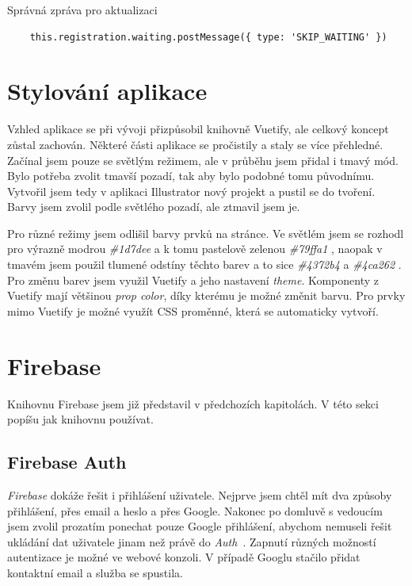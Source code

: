 \begin{listing}[h]
    \caption{Správná zpráva pro aktualizaci}
    \begin{verbatim}
    this.registration.waiting.postMessage({ type: 'SKIP_WAITING' })
    \end{verbatim}
\end{listing}

\section{Stylování aplikace}
Vzhled aplikace se při vývoji přizpůsobil knihovně Vuetify, ale celkový koncept zůstal zachován. Některé části aplikace
se pročistily a staly se více přehledné. Začínal jsem pouze se světlým režimem, ale v průběhu jsem přidal i tmavý mód.
Bylo potřeba zvolit tmavší pozadí, tak aby bylo podobné tomu původnímu. Vytvořil jsem tedy v aplikaci Illustrator nový projekt
a pustil se do tvoření. Barvy jsem zvolil podle světlého pozadí, ale ztmavil jsem je.

Pro různé režimy jsem odlišil barvy prvků na stránce. Ve světlém jsem se rozhodl pro výrazně modrou \emph{\#1d7dee}  a k tomu
pastelově zelenou \emph{\#79ffa1}  , naopak v tmavém jsem použil tlumené odstíny těchto barev a to sice \emph{\#4372b4}   a \emph{\#4ca262}  .
Pro změnu barev jsem využil Vuetify a jeho nastavení \emph{theme}. Komponenty z Vuetify mají většinou \emph{prop color}, díky
kterému je možné změnit barvu. Pro prvky mimo Vuetify je možné využít CSS proměnné, která se automaticky vytvoří.

\section{Firebase}

Knihovnu Firebase jsem již představil v předchozích kapitolách. V této sekci popíšu jak knihovnu používat.

\subsection{Firebase Auth}
\emph{Firebase} dokáže řešit i přihlášení uživatele. Nejprve jsem chtěl mít dva způsoby přihlášení, přes email a heslo a přes
Google. Nakonec po domluvě s vedoucím jsem zvolil prozatím ponechat pouze Google přihlášení, abychom nemuseli řešit ukládání
dat uživatele jinam než právě do \emph{Auth}~\cite{FirebaseAuth}. Zapnutí různých možností autentizace je možné ve webové konzoli. V případě Googlu
stačilo přidat kontaktní email a služba se spustila.

